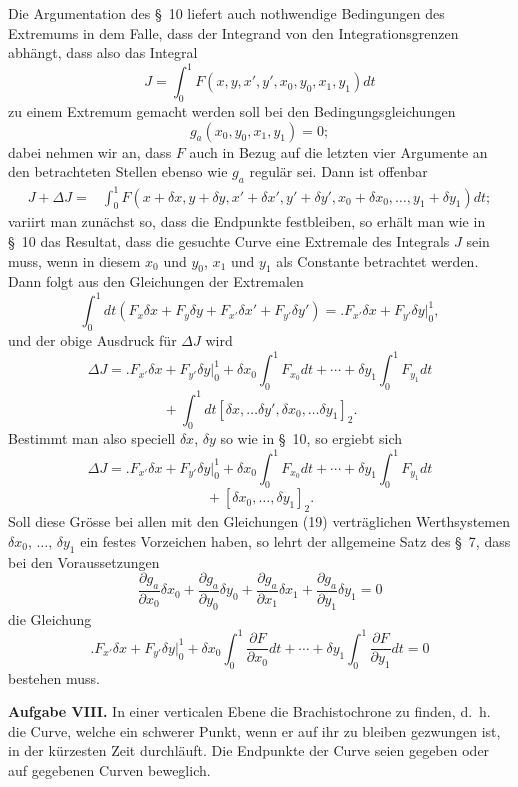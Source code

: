 \documentclass[11pt,a4paper,leqno]{article}
\begin{document}
Die Argumentation des \S~10 liefert auch nothwendige Bedingungen des Extremums in dem Falle, dass der Integrand von den Integrationsgrenzen abhängt, dass also das Integral
\[
J=\int_0^1 F(x,y,x',y',x_0,y_0,x_1,y_1)dt
\]
zu einem Extremum gemacht werden soll bei den Bedingungsgleichungen
\begin{equation}\tag{19}
g_a(x_0,y_0,x_1,y_1)=0;
\end{equation}
dabei nehmen wir an, dass $F$ auch in Bezug auf die letzten vier Argumente an den betrachteten Stellen ebenso wie $g_a$ regulär sei. Dann ist offenbar
\[
\begin{split}
J+\Delta J
={}&\int_0^1 F(x+\delta x,y+\delta y,x'+\delta x',y'+\delta y',x_0+\delta x_0,\ldots,y_1+\delta y_1)dt;
\end{split}
\]
variirt man zunächst so, dass die Endpunkte festbleiben, so erhält man wie in \S~10 das Resultat, dass die gesuchte Curve eine Extremale des Integrals $J$ sein muss, wenn in diesem $x_0$ und $y_0$, $x_1$ und $y_1$ als Constante betrachtet werden. Dann folgt aus den Gleichungen der Extremalen
\[
\int_0^1 dt(F_x\delta x+F_y\delta y+F_{x'}\delta x'+F_{y'}\delta y')=\bigl. F_{x'}\delta x+F_{y'}\delta y\bigr|_0^1,
\]
und der obige Ausdruck für $\Delta J$ wird
\[
\Delta J=\bigl. F_{x'}\delta x+F_{y'}\delta y\bigr|_0^1+\delta x_0\int_0^1 F_{x_0}dt+\cdots+\delta y_1\int_0^1 F_{y_1}dt
\]
\[
{}+\int_0^1dt[\delta x,\ldots \delta y',\delta x_0,\ldots \delta y_1]_2.
\]
Bestimmt man also speciell $\delta x$, $\delta y$ so wie in \S~10, so ergiebt sich
\[
\Delta J=\bigl. F_{x'}\delta x+F_{y'}\delta y\bigr|_0^1+\delta x_0\int_0^1 F_{x_0}dt+\cdots+\delta y_1\int_0^1 F_{y_1}dt
\]
\[
{}+[\delta x_0,\ldots,\delta y_1]_2.
\]
Soll diese Grösse bei allen mit den Gleichungen (19) verträglichen Werthsystemen $\delta x_0$, $\ldots$, $\delta y_1$ ein festes Vorzeichen haben, so lehrt der allgemeine Satz des \S~7, dass bei den Voraussetzungen
\[
\frac{\partial g_a}{\partial x_0}\delta x_0+\frac{\partial g_a}{\partial y_0}\delta y_0+\frac{\partial g_a}{\partial x_1}\delta x_1+\frac{\partial g_a}{\partial y_1}\delta y_1=0
\]
die Gleichung
\[
\bigl. F_{x'}\delta x+F_{y'}\delta y\bigr|_0^1+\delta x_0\int_0^1 \frac{\partial F}{\partial x_0}dt+\cdots+\delta y_1\int_0^1 \frac{\partial F}{\partial y_1}dt=0
\]
bestehen muss.

\medskip
\noindent\textbf{Aufgabe VIII.} In einer verticalen Ebene die Brachistochrone zu finden, d.~h. die Curve, welche ein schwerer Punkt, wenn er auf ihr zu bleiben gezwungen ist, in der kürzesten Zeit durchläuft. Die Endpunkte der Curve seien gegeben oder auf gegebenen Curven beweglich.
\end{document}
